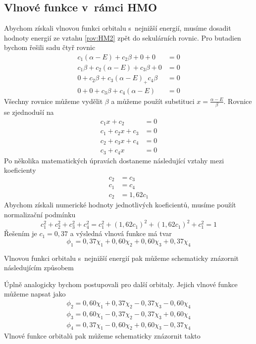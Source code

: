 \subsection{Vlnové funkce v~rámci HMO}
Abychom získali vlnovou funkci orbitalu s~nejnižší energií, musíme dosadit hodnoty energií ze vztahu \eqref{rov:HM2} zpět do sekulárních rovnic. Pro butadien bychom řešili sadu čtyř rovnic
\begin{equation}
\begin{split}
c_1(\alpha -E)+c_2\beta +0 +0 &=0 \\ 
c_1\beta + c_2(\alpha-E)+c_3\beta + 0 &= 0 \\
0 + c_2\beta + c_3(\alpha-E)_+ c_4\beta &= 0 \\
0 + 0 + c_3\beta+ c_4(\alpha -E) &= 0
\end{split}
\end{equation}
Všechny rovnice můžeme vydělit $\beta$ a můžeme použít substituci
$x = \frac{\alpha-E}{\beta}.$
Rovnice se zjednoduší na
\begin{equation}
\begin{split}
c_1x+c_2 &= 0 \\
c_1+c_2x+c_3 &= 0 \\
c_2 + c_3x+c_4 &= 0 \\
c_3 + c_4x &= 0
\end{split}
\end{equation}
Po několika matematických úpravách dostaneme následující vztahy mezi koeficienty
\begin{equation}
\begin{split}
c_2 &= c_3 \\
c_1 &= c_4 \\
c_2 &= 1{,}62c_1
\end{split}
\end{equation}
Abychom získali numerické hodnoty jednotlivých koeficientů, musíme použít normalizační podmínku
\begin{equation}
c_1^2 + c_2^2 + c_3^2 + c_4^2 = c_1^2+(1{,}62c_1)^2+(1{,}62c_1)^2+c_1^2 = 1
\end{equation}
Řešením je $c_1=0{,}37$ a výsledná vlnová funkce má tvar
\begin{equation}
\phi_1 = 0{,}37\chi_1+0{,}60\chi_2+0{,}60\chi_3+0{,}37\chi_4 
\end{equation}

Vlnovou funkci orbitalu s~nejnižší energií pak můžeme schematicky znázornit následujícím způsobem


Úplně analogicky bychom postupovali pro další orbitaly. Jejich vlnové funkce můžeme napsat jako
\begin{equation}
\begin{split}
\phi_2 = 0{,}60\chi_1+0{,}37\chi_2-0{,}37\chi_3-0{,}60\chi_4 \\
\phi_3 = 0{,}60\chi_1-0{,}37\chi_2-0{,}37\chi_3+0{,}60\chi_4 \\
\phi_4 = 0{,}37\chi_1-0{,}60\chi_2+0{,}60\chi_3-0{,}37\chi_4 
\end{split}
\end{equation}
%
Vlnové funkce orbitalů pak můžeme schematicky znázornit takto

